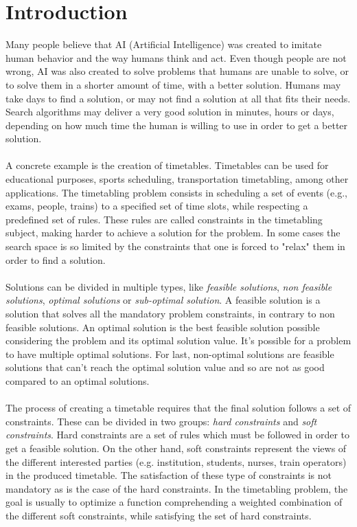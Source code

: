 \setcounter{secnumdepth}{3}
\chapter{Introduction}
\label{introduction}
\thispagestyle{plain}

Many people believe that AI (Artificial Intelligence) was created to imitate human behavior and the way humans think and act. Even though people are not wrong, AI was also created to solve problems that humans are unable to solve, or to solve them in a shorter amount of time, with a better solution. Humans may take days to find a solution, or may not find a solution at all that fits their needs. Search algorithms may deliver a very good solution in minutes, hours or days, depending on how much time the human is willing to use in order to get a better solution. \\
\\
A concrete example is the creation of timetables. Timetables can be used for educational purposes, sports scheduling, transportation timetabling, among other applications. The timetabling problem consists in scheduling a set of events (e.g., exams, people, trains) to a specified set of time slots, while respecting a predefined set of rules. These rules are called constraints in the timetabling subject, making harder to achieve a solution for the problem. In some cases the search space is so limited by the constraints that one is forced to "relax" them in order to find a solution. \\
\\
Solutions can be divided in multiple types, like \textit{feasible solutions}, \textit{non feasible solutions}, \textit{optimal solutions} or \textit{sub-optimal solution}. A feasible solution is a solution that solves all the mandatory problem constraints, in contrary to non feasible solutions. An optimal solution is the best feasible solution possible considering the problem and its optimal solution value. It's possible for a problem to have multiple optimal solutions. For last, non-optimal solutions are feasible solutions that can't reach the optimal solution value and so are not as good compared to an optimal solutions.\\
\\
The process of creating a timetable requires that the final solution follows a set of constraints. These can be divided in two groups: \textit{hard constraints} and \textit{soft constraints}. Hard constraints are a set of rules which must be followed in order to get a feasible solution. On the other hand, soft constraints represent the views of the different interested parties (e.g. institution, students, nurses, train operators) in the produced timetable. The satisfaction of these type of constraints is not mandatory as is the case of the hard constraints. In the timetabling problem, the goal is usually to optimize a function comprehending a weighted combination of the different soft constraints, while satisfying the set of hard constraints. \\
